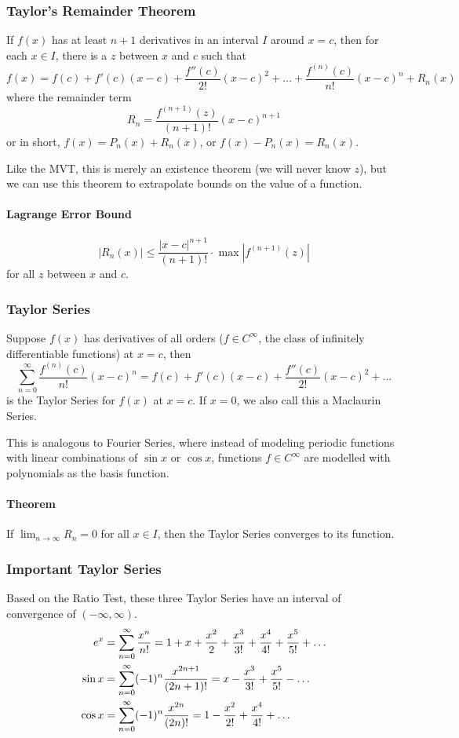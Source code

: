\documentclass{article}
\begin{document}
\subsubsection{Taylor's Remainder Theorem}
If $f(x)$ has at least $n+1$ derivatives in an interval $I$ around $x=c$, then for each $x \in I$, there is a $z$ between $x$ and $c$ such that
$$f(x) = f(c) + f'(c)\left(x-c\right) + \frac{f''(c)}{2!}\left(x-c\right)^2 + \ldots + \frac{f^{(n)}(c)}{n!}\left(x-c\right)^n+R_n(x)$$
where the remainder term $$R_n=\frac{f^{(n+1)}(z)}{(n+1)!}\left(x-c\right)^{n+1}$$
or in short, $f(x) = P_n(x) + R_n(x)$, or $f(x) - P_n(x) = R_n(x)$.

Like the MVT, this is merely an existence theorem (we will never know $z$), but we can use this theorem to extrapolate bounds on the value of a function.

\paragraph{Lagrange Error Bound}
$$\left|R_n(x)\right|\le\frac{\left|x-c\right|^{n+1}}{(n+1)!}\cdot\max\left|f^{(n+1)}(z)\right|$$
for all $z$ between $x$ and $c$.

\subsubsection{Taylor Series}
Suppose $f(x)$ has derivatives of all orders ($f\in C^\infty$, the class of infinitely differentiable functions) at $x=c$, then
$$\sum_{n=0}^\infty \frac{f^{(n)}(c)}{n!}\left(x-c\right)^n=f(c)+f'(c)\left(x-c\right)+\frac{f''(c)}{2!}\left(x-c\right)^2+\ldots$$
is the Taylor Series for $f(x)$ at $x=c$. If $x=0$, we also call this a Maclaurin Series.

This is analogous to Fourier Series, where instead of modeling periodic functions with linear combinations of $\sin{x}$ or $\cos{x}$, functions $f\in C^\infty$ are modelled with polynomials as the basis function.

\paragraph{Theorem} If $\lim_{n\to\infty}\limits R_n=0$ for all $x\in I$, then the Taylor Series converges to its function.

\subsubsection{Important Taylor Series}\label{important-taylor}
Based on the Ratio Test, these three Taylor Series have an interval of convergence of $\left(-\infty,\infty\right)$.
\begin{align*}
    e^x&=\sum_{n=0}^{\infty}\limits\frac{x^n}{n!}=1+x+\frac{x^2}{2}+\frac{x^3}{3!}+\frac{x^4}{4!}+\frac{x^5}{5!}+\ldots\\
    \sin{x}&=\sum_{n=0}^\infty(-1)^n\frac{x^{2n+1}}{(2n+1)!}=x-\frac{x^3}{3!}+\frac{x^5}{5!}-\ldots\\
    \cos{x}&=\sum_{n=0}^\infty(-1)^n\frac{x^{2n}}{(2n)!}=1-\frac{x^2}{2!}+\frac{x^4}{4!}+\ldots
\end{align*}
\end{document}
